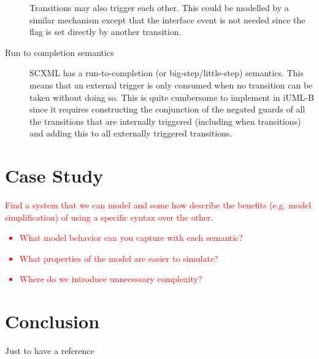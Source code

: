 \documentclass{easychair}
\begin{document}
\begin{description}
Transitions may also trigger each other. This could be 
modelled by a similar mechanism except that the interface 
event is not needed since the flag is set directly by 
another transition.

\item [Run to completion semantics] SCXML has a run-to-completion 
(or big-step/little-step) semantics. This means that an external 
trigger is only consumed when no transition can be taken without 
doing so. This is quite cumbersome to implement in iUML-B since 
it requires constructing the conjunction of the negated guards of
all the transitions that are internally triggered (including when 
transitions) and adding this to all externally triggered transitions.

\end{description}









\section{Case Study}
\label{sect:caseS}

\textcolor{red}{Find a system that we can model and some how describe the benefits 
(e.g. model simplification) of using a specific syntax over the other.
	\begin{itemize}
		\item What model behavior can you capture with each semantic?
		\item What properties of the model are easier to simulate?
		\item Where do we introduce unnecessary complexity?
	\end{itemize}	
}

\section{Conclusion}
\label{sect:concl}

Just to have a reference ~\cite{texniccenter}
\end{document}
